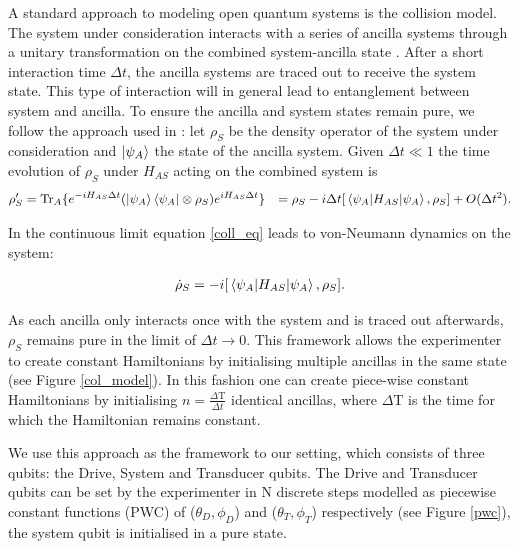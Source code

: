 A standard approach to modeling open quantum systems is the collision model.
The system under consideration interacts with a series of ancilla systems through a unitary transformation on the combined system-ancilla state \cite{Lorenzo_2017}. After a short interaction time $\Delta t$, the ancilla systems are traced out to receive the system state.
This type of interaction will in general lead to entanglement between system and ancilla.
To ensure the ancilla and system states remain pure, we follow the approach used in \cite{beyer2020}:
let $\rho_S$ be the density operator of the system under consideration and $\ket{\psi_A}$ the state of the ancilla system.
Given $\Delta t \ll 1$ the time evolution of $\rho_S$ under $H_{AS}$ acting on the combined system is
\begin{align}\label{coll_eq}
\rho'_S & = \mathrm{Tr}_A \{ e^{-i H_{AS} \Delta t} (\ket{\psi_A} \bra{\psi_A} \otimes \rho_S) e^{i H_{AS} \Delta t} \} & = \rho_S - i \Delta t [\expval{H_{AS}}{\psi_A}, \rho_S] + O(\Delta t^2).
\end{align}

In the continuous limit equation \ref{coll_eq} leads to von-Neumann dynamics on the system:

\begin{align*}
	\dot{\rho}_S = - i [\expval{H_{AS}}{\psi_A}, \rho_S].
\end{align*}

As each ancilla only interacts once with the system and is traced out afterwards, $\rho_S$ remains pure in the limit of $\Delta t \to 0$.
This framework allows the experimenter to create constant Hamiltonians by initialising multiple ancillas in the same state (see Figure \ref{col_model}).
In this fashion one can create piece-wise constant Hamiltonians by initialising $n = \frac{\Delta \mathrm{T}}{\Delta t}$ identical ancillas, where $\Delta \mathrm{T}$ is the time for which the Hamiltonian remains constant.

We use this approach as the framework to our setting, which consists of three qubits: the Drive, System and Transducer qubits. The Drive and Transducer qubits can be set by the experimenter in N discrete steps modelled as piecewise constant functions (PWC) of ($\theta_D, \phi_D$) and ($\theta_T, \phi_T$) respectively (see Figure \ref{pwc}), the system qubit is initialised in a pure state.

